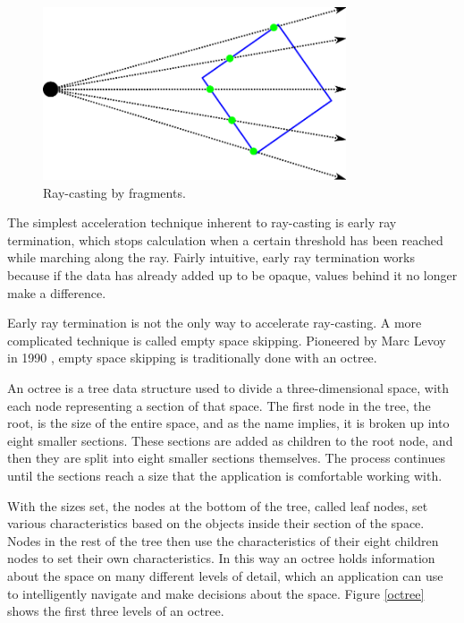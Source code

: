 \documentclass{article}
\begin{document}
\begin{figure}
\centering
\includegraphics[width=0.8\textwidth]{fragment-ray-casting.pdf}
\caption{Ray-casting by fragments.}
\label{fragment-ray-casting}
\end{figure}

The simplest acceleration technique inherent to ray-casting is early ray
termination, which stops calculation when a certain threshold has been reached
while marching along the ray.  Fairly intuitive, early ray termination works
because if the data has already added up to be opaque, values behind it no
longer make a difference.

Early ray termination is not the only way to accelerate ray-casting. A more
complicated technique is called empty space skipping.  Pioneered by Marc Levoy
in 1990 \cite{Levoy90}, empty space skipping is traditionally done with an
octree.

An octree is a tree data structure used to divide a three-dimensional space,
with each node representing a section of that space.  The first node in the
tree, the root, is the size of the entire space, and as the name implies, it is
broken up into eight smaller sections.  These sections are added as children to
the root node, and then they are split into eight smaller sections themselves.
The process continues until the sections reach a size that the application is
comfortable working with.

With the sizes set, the nodes at the bottom of the tree, called leaf nodes, set
various characteristics based on the objects inside their section of the space.
Nodes in the rest of the tree then use the characteristics of their eight
children nodes to set their own characteristics.  In this way an octree holds
information about the space on many different levels of detail, which an
application can use to intelligently navigate and make decisions about the
space.  Figure \ref{octree} shows the first three levels of an octree.
\end{document}
